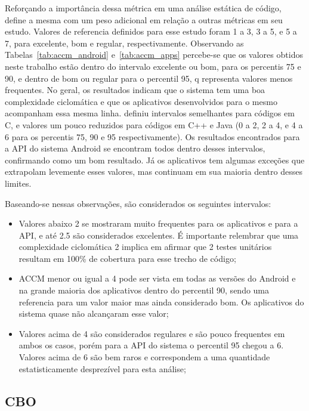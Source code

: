 Reforçando a importância dessa métrica em uma análise estática de código,  define a mesma com um peso adicional em relação a outras métricas em seu estudo. Valores de referencia definidos para esse estudo foram 1 a 3, 3 a 5, e 5 a 7, para excelente, bom e regular, respectivamente. Observando as Tabelas~\ref{tab:accm_android} e~\ref{tab:accm_apps} percebe-se que os valores obtidos neste trabalho estão dentro do intervalo excelente ou bom, para os percentis 75 e 90, e dentro de bom ou regular para o percentil 95, q representa valores menos frequentes. No geral, os resultados indicam que o sistema tem uma boa complexidade ciclomática e que os aplicativos desenvolvidos para o mesmo acompanham essa mesma linha.  definiu intervalos semelhantes para códigos em C, e valores um pouco reduzidos para códigos em C++ e Java (0 a 2, 2 a 4, e 4 a 6 para os percentis 75, 90 e 95 respectivamente).  Os resultados encontrados para a API do sistema Android se encontram todos dentro desses intervalos, confirmando como um bom resultado. Já os aplicativos tem algumas exceções que extrapolam levemente esses valores, mas continuam em sua maioria dentro desses limites.

Baseando-se nessas observações, são considerados os seguintes intervalos:

\begin{itemize}
\item Valores abaixo 2 se mostraram muito frequentes para os aplicativos e para a API, e até 2.5 são considerados excelentes. É importante relembrar que uma complexidade ciclomática 2 implica em afirmar que 2 testes unitários resultam em 100\% de cobertura para esse trecho de código;
\item ACCM menor ou igual a 4 pode ser vista em todas as versões do Android e na grande maioria dos aplicativos dentro do percentil 90, sendo uma referencia para um valor maior mas ainda considerado bom. Os aplicativos do sistema quase não alcançaram esse valor;
\item Valores acima de 4 são considerados regulares e são pouco frequentes em ambos os casos, porém para a API do sistema o percentil 95 chegou a 6. Valores acima de 6 são bem raros e correspondem a uma quantidade estatisticamente desprezível para esta análise;
\end{itemize}

\subsection{CBO}
